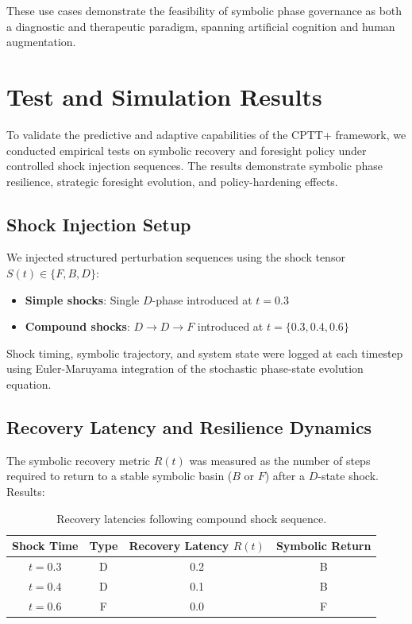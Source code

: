 \documentclass[12pt]{article}
\begin{document}
These use cases demonstrate the feasibility of symbolic phase governance as both a diagnostic and therapeutic paradigm, spanning artificial cognition and human augmentation.

\section{Test and Simulation Results}

To validate the predictive and adaptive capabilities of the CPTT+ framework, we conducted empirical tests on symbolic recovery and foresight policy under controlled shock injection sequences. The results demonstrate symbolic phase resilience, strategic foresight evolution, and policy-hardening effects.

\subsection{Shock Injection Setup}

We injected structured perturbation sequences using the shock tensor $S(t) \in \{F, B, D\}$:

\begin{itemize}
    \item \textbf{Simple shocks}: Single $D$-phase introduced at $t=0.3$
    \item \textbf{Compound shocks}: $D \rightarrow D \rightarrow F$ introduced at $t = \{0.3, 0.4, 0.6\}$
\end{itemize}

Shock timing, symbolic trajectory, and system state were logged at each timestep using Euler-Maruyama integration of the stochastic phase-state evolution equation.

\subsection{Recovery Latency and Resilience Dynamics}

The symbolic recovery metric $R(t)$ was measured as the number of steps required to return to a stable symbolic basin ($B$ or $F$) after a $D$-state shock. Results:

\begin{table}[H]
\centering
\begin{tabular}{cccc}
\toprule
\textbf{Shock Time} & \textbf{Type} & \textbf{Recovery Latency} $R(t)$ & \textbf{Symbolic Return} \\
\midrule
$t = 0.3$ & D & 0.2 & B \\
$t = 0.4$ & D & 0.1 & B \\
$t = 0.6$ & F & 0.0 & F \\
\bottomrule
\end{tabular}
\caption{Recovery latencies following compound shock sequence.}
\end{table}
\end{document}
